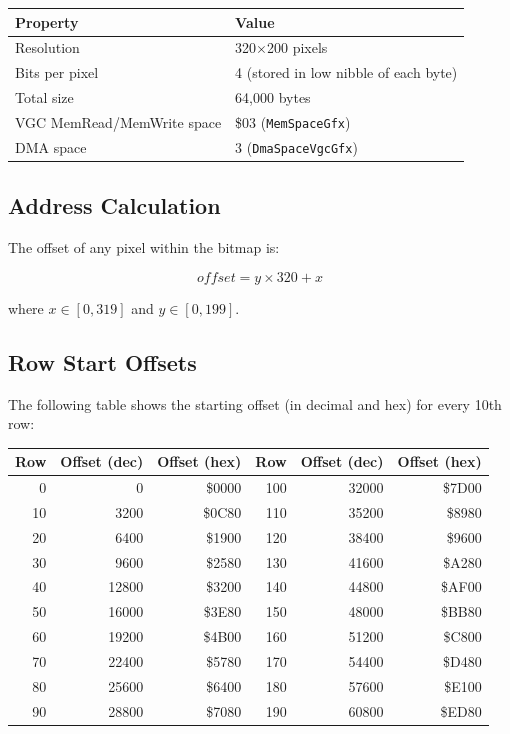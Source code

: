 \begin{center}
\small
\begin{tabular}{@{}ll@{}}
\toprule
\textbf{Property}         & \textbf{Value} \\
\midrule
Resolution                 & 320$\times$200 pixels \\
Bits per pixel             & 4 (stored in low nibble of each byte) \\
Total size                 & 64,000 bytes \\
VGC MemRead/MemWrite space & \$03 (\texttt{MemSpaceGfx}) \\
DMA space                  & 3 (\texttt{DmaSpaceVgcGfx}) \\
\bottomrule
\end{tabular}
\end{center}

\subsection{Address Calculation}

The offset of any pixel within the bitmap is:

\[
  \textit{offset} = y \times 320 + x
\]

where $x \in [0, 319]$ and $y \in [0, 199]$.

\subsection{Row Start Offsets}

The following table shows the starting offset (in decimal and hex) for every
10th row:

\begin{center}
\small
\begin{tabular}{@{}rrr@{\qquad}rrr@{}}
\toprule
\textbf{Row} & \textbf{Offset (dec)} & \textbf{Offset (hex)} &
\textbf{Row} & \textbf{Offset (dec)} & \textbf{Offset (hex)} \\
\midrule
  0 &     0 & \$0000 &  100 & 32000 & \$7D00 \\
 10 &  3200 & \$0C80 &  110 & 35200 & \$8980 \\
 20 &  6400 & \$1900 &  120 & 38400 & \$9600 \\
 30 &  9600 & \$2580 &  130 & 41600 & \$A280 \\
 40 & 12800 & \$3200 &  140 & 44800 & \$AF00 \\
 50 & 16000 & \$3E80 &  150 & 48000 & \$BB80 \\
 60 & 19200 & \$4B00 &  160 & 51200 & \$C800 \\
 70 & 22400 & \$5780 &  170 & 54400 & \$D480 \\
 80 & 25600 & \$6400 &  180 & 57600 & \$E100 \\
 90 & 28800 & \$7080 &  190 & 60800 & \$ED80 \\
\bottomrule
\end{tabular}
\end{center}


